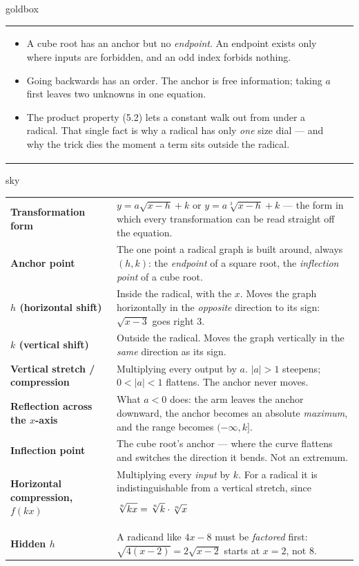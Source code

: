 \documentclass[10pt]{article}
\newcommand{\TallMath}[1]{$\displaystyle #1\rule[-1.4em]{0pt}{3.2em}$}
\begin{document}
\begin{skillbox}{goldbox}
\begin{tabularx}{\linewidth}{@{}X|X@{}}
\begin{itemize}[leftmargin=1.1em, nosep, after=\vspace{2pt}]
  \item A cube root has an anchor but no \emph{endpoint}. An endpoint exists only where inputs are forbidden, and an odd index forbids nothing.
  \item Going backwards has an order. The anchor is free information; taking $a$ first leaves two unknowns in one equation.
  \item The product property (5.2) lets a constant walk out from under a radical. That single fact is why a radical has only \emph{one} size dial --- and why the trick dies the moment a term sits outside the radical.
\end{itemize}
\end{tabularx}
\end{skillbox}

\begin{skillbox}{sky}
\renewcommand{\arraystretch}{1.3}
\begin{tabularx}{\linewidth}{@{}l X@{}}
\textbf{Transformation form} & $y=a\sqrt{x-h}+k$ or $y=a\sqrt[3]{x-h}+k$ --- the form in which every transformation can be read straight off the equation. \\
\textbf{Anchor point} & The one point a radical graph is built around, always $(h,k)$: the \emph{endpoint} of a square root, the \emph{inflection point} of a cube root. \\
\textbf{$h$ (horizontal shift)} & Inside the radical, with the $x$. Moves the graph horizontally in the \emph{opposite} direction to its sign: $\sqrt{x-3}$ goes right $3$. \\
\textbf{$k$ (vertical shift)} & Outside the radical. Moves the graph vertically in the \emph{same} direction as its sign. \\
\textbf{Vertical stretch / compression} & Multiplying every output by $a$. $|a|>1$ steepens; $0<|a|<1$ flattens. The anchor never moves. \\
\textbf{Reflection across the $x$-axis} & What $a<0$ does: the arm leaves the anchor downward, the anchor becomes an absolute \emph{maximum}, and the range becomes $(-\infty,k]$. \\
\textbf{Inflection point} & The cube root's anchor --- where the curve flattens and switches the direction it bends. Not an extremum. \\
\textbf{Horizontal compression, $f(kx)$} & Multiplying every \emph{input} by $k$. For a radical it is indistinguishable from a vertical stretch, since \TallMath{\sqrt[n]{kx}=\sqrt[n]{k}\cdot\sqrt[n]{x}} \\
\textbf{Hidden $h$} & A radicand like $4x-8$ must be \emph{factored} first: $\sqrt{4(x-2)}=2\sqrt{x-2}$ starts at $x=2$, not $8$. \\
\end{tabularx}
\end{skillbox}
\end{document}
